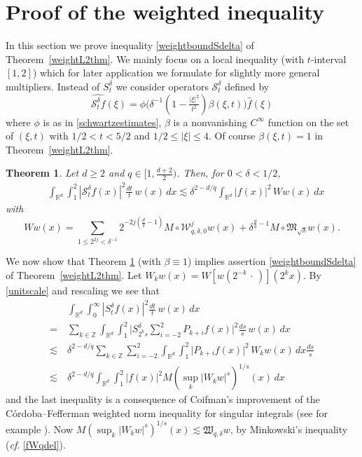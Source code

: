 \documentclass[11pt]{amsart}
\newtheorem{theorem}{Theorem}[section]
\theoremstyle{definition}
\numberwithin{theorem}{section}
\numberwithin{definition}{section}
\newcommand{\Be}{\begin{equation}}
\newcommand{\Ee}{\end{equation}}
\newcommand{\R}{\mathbb{R}}
\newcommand{\note}[1]{\footnote{\texttt{\Small #1}}}
\def\R{\mathbb R}
\def\cf{{\it cf}}
\def\lc{\lesssim}
\def\fM{{\mathfrak {M}}}
\def\fW{{\mathfrak {W}}}
\def\bbR{{\mathbb {R}}}
\def\bbZ{{\mathbb {Z}}}
\def\cS{{\mathcal {S}}}
\def\cW{{\mathcal {W}}}
\begin{document}
\section{Proof of the weighted inequality} \label{proofweighted}
In  this section we prove  inequality  \eqref{weightboundSdelta}
of Theorem~\ref{weightL2thm}.
We mainly focus on a local inequality (with $t$-interval $[1,2]$) which for later application  we formulate for slightly more general multipliers.
Instead of $S^\delta_t$ we consider  operators $\cS^\delta_t$ defined by
$$
\widehat {\cS^{\delta}_t f}(\xi)=
\phi\big(\delta^{-1}(1-\tfrac{|\xi|^2}{t^2}) \beta(\xi,t)\big)\widehat f(\xi)
$$
where   $\phi$ is as in \eqref{schwartzestimates}, $\beta$ is a nonvanishing $C^\infty$ function on the set of  $(\xi,t)$ with $1/2< t< 5/2$ and
 $1/2\le |\xi|\le 4$.
Of course $\beta(\xi,t)=1$ in Theorem~\ref{weightL2thm}.






\begin{theorem}\label{Tdeltat}
Let $d\ge2$ and $q\in[1,\frac{d+2}{2})$.
Then, for $0<\delta<1/2$,
\Be\label{unitscale}\begin{aligned}
&\int_{\R^d}\int_{1}^2|\cS^\delta_tf(x)|^2\frac{dt}{t}\, w(x)\,dx
\lc \delta^{2-d/q}\int_{\bbR^d} |f(x)|^2\,Ww(x) \,dx
\end{aligned}
\Ee
with
$$
Ww(x)=
\sum_{1\le 2^{2j}<
\delta^{-1}} 2^{-2j(\frac dq -1)} M\!\circ\!\cW^j_{q,\delta,0} w (x) +\delta^{\frac dq -1}  M\! \circ \fM_{\sqrt\delta}w(x).
$$
\end{theorem}



We now show that Theorem \ref{Tdeltat}   (with $\beta\equiv1$)
implies
assertion \eqref{weightboundSdelta} of Theorem~\ref{weightL2thm}.
Let $W_kw(x)= W[w(2^{-k}\,\cdot\,)](2^kx)$. By \eqref{unitscale} and rescaling we see that
\begin{align*}
&\int_{\R^d}\int_{0}^\infty|S^\delta_tf(x)|^2\frac{dt}{t}\, w(x)\,dx
\\
=\ & \sum_{k\in \bbZ}
\int_{\R^d}\int_{1}^2\big|S^\delta_{2^k s}\sum_{i=-2}^2 P_{k+i}f(x)\big|^2\frac{ds}{s}\, w(x)\,dx
\\
\lc\ &\delta^{2-d/q}
\sum_{k\in \bbZ}\sum_{i=-2}^2
\int_{\R^d}\int_{1}^2\big|
P_{k+i}f(x)\big|^2 \,W_k w(x)\,dx
\frac{ds}{s}
\\
\lc\ &\delta^{2-d/q}
\int_{\R^d}\int_{1}^2|f(x)|^2
M(\sup_k|W_k w|^s)^{1/s}(x)\,dx
\end{align*}
and the last inequality is a consequence of Coifman's improvement
of the C\'ordoba--Fefferman
weighted norm inequality for singular integrals (see for example \cite[p. 417]{gcrdf}).
Now $M(\sup_k|W_k w|^s)^{1/s}(x)\lc \fW_{q,\delta}w$, by Minkowski's inequality
(\cf. \eqref{fWqdel}).
\end{document}
